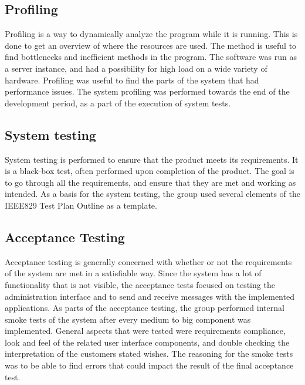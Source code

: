 \subsection{Profiling}
\label{subsec:testing-test_description-profiling}

Profiling is a way to dynamically analyze the program while it is running. This is done to get an overview of where the resources are used. The method is useful to find bottlenecks and inefficient methods in the program. The software was run as a server instance, and had a possibility for high load on a wide variety of hardware. Profiling was useful to find the parts of the system that had performance issues. The system profiling was performed towards the end of the development period, as a part of the execution of system tests.

\subsection{System testing}
\label{subsec:testing-test_description-system_testing}

System testing is performed to ensure that the product meets its requirements. It is a black-box test, often performed upon completion of the product. The goal is to go through all the requirements, and ensure that they are met and working as intended. As a basis for the system testing, the group used several elements of the IEEE829 Test Plan Outline \cite{test-plan} as a template.

\subsection{Acceptance Testing}
\label{subsec:testing-test_description-acceptance_testing}
Acceptance testing is generally concerned with whether or not the requirements of the system are met in a satisfiable way. Since the system has a lot of functionality that is not visible, the acceptance tests focused on testing the administration interface and to send and receive messages with the implemented applications.
As parts of the acceptance testing, the group performed internal smoke tests \cite{smoke-test} of the system after every medium to big component was implemented. General aspects that were tested were requirements compliance, look and feel of the related user interface components, and double checking the interpretation of the customers stated wishes. The reasoning for the smoke tests was to be able to find errors that could impact the result of the final acceptance test.

